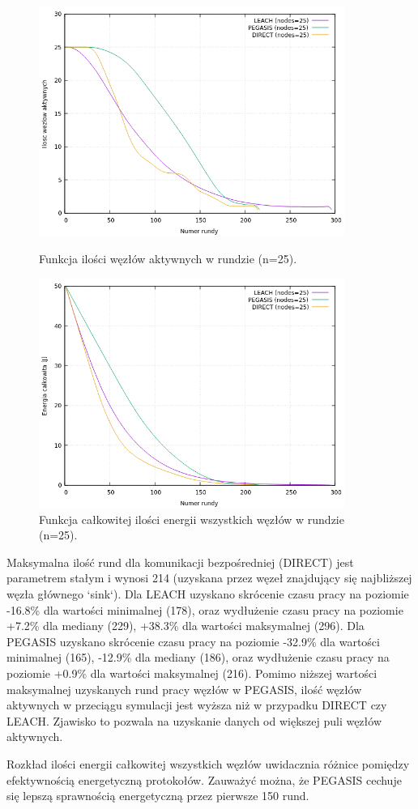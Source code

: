 \documentclass[a4paper,12pt,twoside,openany]{report}
\begin{document}
\begin{figure}[H]
 \centering
 \includegraphics[width=10cm]{images/gnuplot/test_2/nodes_in_round_25.png}
 \caption{Funkcja ilości węzłów aktywnych w rundzie (n=25).}
 \includegraphics[width=10cm]{images/gnuplot/test_2/energy_in_round_25.png}
 \caption{Funkcja całkowitej ilości energii wszystkich węzłów w rundzie (n=25).}
\end{figure}

\par
Maksymalna ilość rund dla komunikacji bezpośredniej (DIRECT) jest parametrem stałym i wynosi 214 (uzyskana przez węzeł znajdujący się najbliższej węzła głównego `sink`).
Dla LEACH uzyskano skrócenie czasu pracy na poziomie -16.8\% dla wartości minimalnej (178), oraz wydłużenie czasu pracy na poziomie +7.2\% dla mediany (229), +38.3\% dla wartości maksymalnej (296).
Dla PEGASIS uzyskano skrócenie czasu pracy na poziomie -32.9\% dla wartości minimalnej (165), -12.9\% dla mediany (186), oraz wydłużenie czasu pracy na poziomie +0.9\% dla wartości maksymalnej (216).
Pomimo niższej wartości maksymalnej uzyskanych rund pracy węzłów w PEGASIS, ilość węzłów aktywnych w przeciągu symulacji jest wyższa niż w przypadku DIRECT czy LEACH.
Zjawisko to pozwala na uzyskanie danych od większej puli węzłów aktywnych.
\par
Rozkład ilości energii całkowitej wszystkich węzłów uwidacznia różnice pomiędzy efektywnością energetyczną protokołów.
Zauważyć można, że PEGASIS cechuje się lepszą sprawnością energetyczną przez pierwsze 150 rund.
\end{document}
